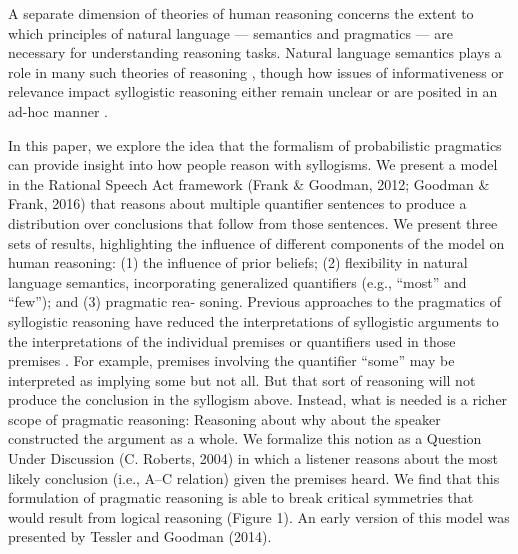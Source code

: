 \documentclass[floatsintext, doc]{apa6}
\begin{document}
A separate dimension of theories of human reasoning concerns the extent to which principles of natural language — semantics and pragmatics — are necessary for understanding reasoning tasks. 
Natural language semantics plays a role in many such theories of reasoning \cite{JL1978, Khemlani2012, geurts2003reasoning}, though how issues of informativeness or relevance impact syllogistic reasoning either remain unclear \cite{Roberts2001} or are posited in an ad-hoc manner \cite{Chater1999}. 

In this paper, we explore the idea that the formalism of probabilistic pragmatics can provide insight into how people reason with syllogisms.
We present a model in the Rational Speech Act framework (Frank \& Goodman, 2012; Goodman \& Frank, 2016) that reasons about multiple quantifier sentences to produce a distribution over conclusions that follow from those sentences. We present three sets of results, highlighting the influence of different components of the model on human reasoning: (1) the influence of prior beliefs; (2) flexibility in natural language semantics, incorporating generalized quantifiers (e.g., “most” and “few”); and (3) pragmatic rea- soning. Previous approaches to the pragmatics of syllogistic reasoning have reduced the interpretations of syllogistic arguments to the interpretations of the individual premises or quantifiers used in those premises \cite{Roberts2001}. For example, premises involving the quantifier “some” may be interpreted as implying some but not all. But that sort of reasoning will not produce the conclusion in the syllogism above. Instead, what is needed is a richer scope of pragmatic reasoning: Reasoning about why about the speaker constructed the argument as a whole. We formalize this notion as a Question Under Discussion (C. Roberts, 2004) in which a listener reasons about the most likely conclusion (i.e., A–C relation) given the premises heard. We find that this formulation of pragmatic reasoning is able to break critical symmetries that would result from logical reasoning (Figure 1). An early version of this model was presented by Tessler and Goodman (2014).
\end{document}
